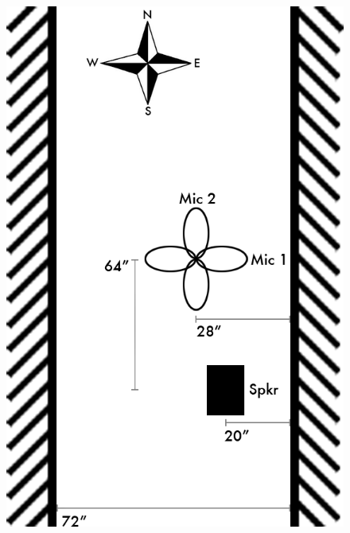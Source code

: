 \documentclass{aes137}
\begin{document}
\begin{figure} 
\begin{minipage}[b]{0.46\linewidth} \centering
\includegraphics[width=\textwidth]{images/alleyway_birdseye.png}
\end{minipage}
\hspace{0.1\linewidth}
\begin{minipage}[b]{0.41\linewidth} \centering

\end{minipage}
\end{figure}
\end{document}

